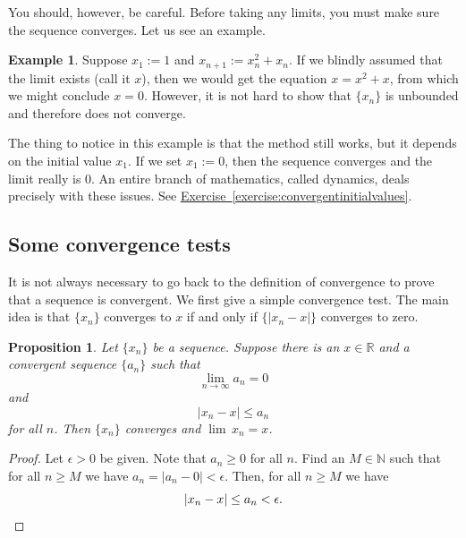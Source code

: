 \documentclass[12pt]{book}
\newcommand{\abs}[1]{\left\lvert {#1} \right\rvert}
\newcommand{\R}{{\mathbb{R}}}
\newcommand{\N}{{\mathbb{N}}}
\theoremstyle{plain}
\newtheorem{prop}[thm]{Proposition}
\theoremstyle{remark}
\theoremstyle{definition}
\theoremstyle{exercise}
\theoremstyle{example}
\newtheorem{example}[thm]{Example}
\newcommand{\exerciseref}[1]{\hyperref[#1]{Exercise~\ref*{#1}}}
\begin{document}
You should, however, be careful.  Before taking any limits, you must
make sure the sequence converges.  Let us see an example.

\begin{example}
Suppose $x_1 := 1$ and $x_{n+1} := x_n^2+x_n$.
If we blindly assumed that the limit exists (call it $x$), then we
would get the equation $x = x^2+x$, from which we might
conclude $x=0$.  However, it is not hard
to show that $\{ x_n \}$ is unbounded and therefore does not converge.

The thing to notice in this example is that the method still works, but
it depends on the initial value $x_1$.  If we set $x_1 := 0$,
then the sequence converges and the limit really is 0.
An entire branch of mathematics, called dynamics, deals precisely with these
issues.
See
\exerciseref{exercise:convergentinitialvalues}.
\end{example}

\subsection{Some convergence tests}

It is not always necessary to go back to the definition of convergence
to prove that a sequence is convergent.  We first give a simple convergence test.
The main idea is that 
$\{ x_n \}$ converges to $x$ if and only if 
$\{ \abs{ x_n - x } \}$ converges to zero.

\begin{prop} \label{convzero:prop}
Let $\{ x_n \}$ be a sequence. 
Suppose there is an $x \in \R$
and a convergent sequence $\{ a_n \}$
such that
\begin{equation*}
\lim_{n\to\infty} a_n = 0
\end{equation*}
and 
\begin{equation*}
\abs{x_n - x} \leq a_n
\end{equation*}
for all $n$.  Then $\{ x_n \}$ converges and $\lim\, x_n = x$.
\end{prop}

\begin{proof}
Let $\epsilon > 0$ be given.  Note that $a_n \geq 0$
for all $n$.  Find an $M \in \N$ such that for
all $n \geq M$ we have
$a_n = \abs{a_n - 0} < \epsilon$.  Then, for all $n \geq M$
we have
\begin{equation*}
\abs{x_n - x} \leq a_n < \epsilon . \qedhere
\end{equation*}
\end{proof}
\end{document}
